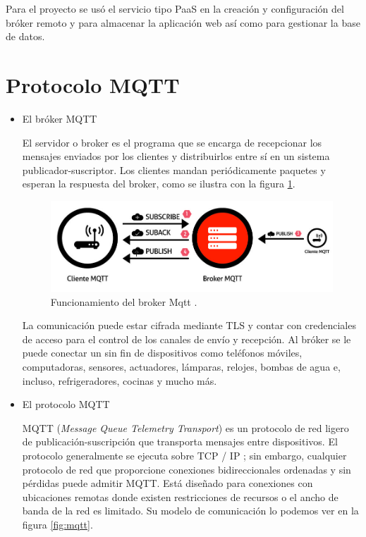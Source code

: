 
Para el proyecto se usó el servicio tipo PaaS en la creación y configuración del bróker remoto y para almacenar la aplicación web así como para gestionar la base de datos.

\section{Protocolo MQTT}

\begin{itemize}
\item El bróker MQTT

El servidor o broker es el programa que se encarga de recepcionar los mensajes enviados por los clientes y distribuirlos entre sí en un sistema publicador-suscriptor. Los clientes mandan periódicamente paquetes y esperan la respuesta del broker, como se ilustra con la figura \ref{fig:broker}. 

\begin{figure}[htbp]
	\centering
	\includegraphics[width=.7\textwidth]{./Figures/broker.jpg}
	\caption{Funcionamiento del broker Mqtt \protect\footnotemark.}

	\label{fig:broker}
\end{figure}


La comunicación puede estar cifrada mediante TLS y contar con credenciales de acceso para el control de los canales de envío y recepción. Al bróker se le puede conectar un sin fin de dispositivos como teléfonos móviles, computadoras, sensores, actuadores, lámparas, relojes, bombas de agua e, incluso, refrigeradores, cocinas y mucho más. 

\item El protocolo MQTT

MQTT (\textit{Message Queue Telemetry Transport}) es un protocolo de red ligero de publicación-suscripción que transporta mensajes entre dispositivos. El protocolo generalmente se ejecuta sobre TCP / IP ; sin embargo, cualquier protocolo de red que proporcione conexiones bidireccionales ordenadas y sin pérdidas puede admitir MQTT. Está diseñado para conexiones con ubicaciones remotas donde existen restricciones de recursos o el ancho de banda de la red es limitado. Su modelo de comunicación lo podemos ver en la figura \ref{fig:mqtt}.


\end{itemize}
